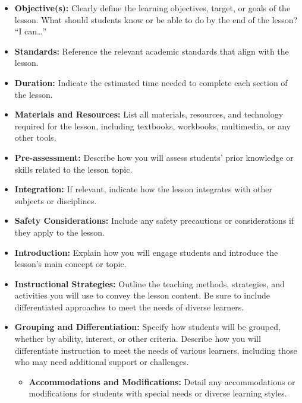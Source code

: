 \documentclass[11pt]{article}
\begin{document}
\begin{itemize}
\item \textbf{\textbf{Objective(s):}} Clearly define the learning objectives, target, or goals of the lesson. What should students know or be able to do by the end of the lesson? “I can\ldots{}”

\item \textbf{\textbf{Standards:}} Reference the relevant academic standards that align with the lesson.

\item \textbf{\textbf{Duration:}} Indicate the estimated time needed to complete each section of the lesson.

\item \textbf{\textbf{Materials and Resources:}} List all materials, resources, and technology required for the lesson, including textbooks, workbooks, multimedia, or any other tools.

\item \textbf{\textbf{Pre-assessment:}} Describe how you will assess students’ prior knowledge or skills related to the lesson topic.

\item \textbf{\textbf{Integration:}} If relevant, indicate how the lesson integrates with other subjects or disciplines.

\item \textbf{\textbf{Safety Considerations:}} Include any safety precautions or considerations if they apply to the lesson.

\item \textbf{\textbf{Introduction:}} Explain how you will engage students and introduce the lesson’s main concept or topic.

\item \textbf{\textbf{Instructional Strategies:}} Outline the teaching methods, strategies, and activities you will use to convey the lesson content. Be sure to include differentiated approaches to meet the needs of diverse learners.

\item \textbf{\textbf{Grouping and Differentiation:}} Specify how students will be grouped, whether by ability, interest, or other criteria. Describe how you will differentiate instruction to meet the needs of various learners, including those who may need additional support or challenges.

\begin{itemize}
\item \textbf{\textbf{Accommodations and Modifications:}} Detail any accommodations or modifications for students with special needs or diverse learning styles.


\end{itemize}
\end{itemize}
\end{document}
